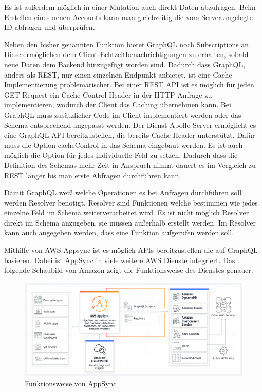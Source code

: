 Es ist außerdem möglich in einer Mutation auch direkt Daten abzufragen. Beim Erstellen eines neuen Accounts kann man gleichzeitig die
vom Server angelegte ID abfragen und überprüfen.


Neben den bisher genannten Funktion bietet GraphQL noch Subscriptions an.
Diese ermöglichen dem Client Echtzeitbenachrichtigungen zu erhalten, sobald neue Daten dem Backend hinzugefügt worden sind.
Dadurch dass GraphQL, anders als REST, nur einen einzelnen Endpunkt anbietet, ist eine Cache Implementierung problematischer.
Bei einer REST API ist es möglich für jeden GET Request ein Cache-Control Header in der HTTP Anfrage zu implementieren, wodurch der Client das Caching übernehmen kann.
Bei GraphQL muss zusätzlicher Code im Client implementiert werden oder das Schema entsprechend angepasst werden. Der Dienst Apollo Server ermöglicht es
eine GraphQL API bereitzustellen, die bereits Cache Header unterstützt. Dafür muss die Option \glqq{}cacheControl\grqq{} in das Schema eingebaut werden. Es ist auch möglich
die Option für jedes individuelle Feld zu setzen. \cite[]{Apollo}
Dadurch dass die Definition des Schemas mehr Zeit in Anspruch nimmt dauert es im Vergleich zu REST länger bis man erste Abfragen durchführen kann. \cite[]{GraphQL} \cite[]{GraphQL1}

Damit GraphQL weiß welche Operationen es bei Anfragen durchführen soll werden Resolver benötigt.
Resolver sind Funktionen welche bestimmen wie jedes einzelne Feld im Schema weiterverarbeitet wird.
Es ist nicht möglich Resolver direkt im Schema anzugeben, sie müssen außerhalb erstellt werden. Im Resolver kann auch
angegeben werden, dass eine Funktion aufgerufen werden soll.

\clearpage
Mithilfe von AWS Appsync ist es möglich APIs bereitzustellen die auf GraphQL basieren. Dabei ist AppSync in viele weitere AWS Dienste integriert.
Das folgende Schaubild von Amazon zeigt die Funktionsweise des Dienstes genauer.
\begin{figure}[htbp]
    \centering
    \includegraphics[width=1.0\textwidth]{40-AWS/Appsync.png}
    \caption{Funktionsweise von AppSync \cite[]{AppSync}  }
    \label{fig:meine-grafik}
\end{figure}

